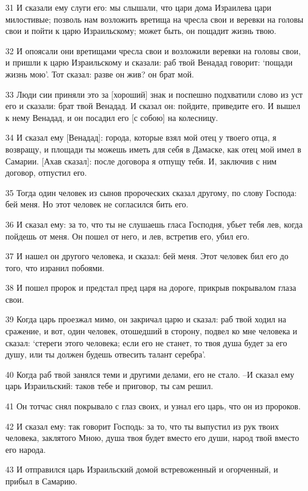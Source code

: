 \par 31 И сказали ему слуги его: мы слышали, что цари дома Израилева цари милостивые; позволь нам возложить вретища на чресла свои и веревки на головы свои и пойти к царю Израильскому; может быть, он пощадит жизнь твою.
\par 32 И опоясали они вретищами чресла свои и возложили веревки на головы свои, и пришли к царю Израильскому и сказали: раб твой Венадад говорит: `пощади жизнь мою'. Тот сказал: разве он жив? он брат мой.
\par 33 Люди сии приняли это за [хороший] знак и поспешно подхватили слово из уст его и сказали: брат твой Венадад. И сказал он: пойдите, приведите его. И вышел к нему Венадад, и он посадил его [с собою] на колесницу.
\par 34 И сказал ему [Венадад]: города, которые взял мой отец у твоего отца, я возвращу, и площади ты можешь иметь для себя в Дамаске, как отец мой имел в Самарии. [Ахав сказал]: после договора я отпущу тебя. И, заключив с ним договор, отпустил его.
\par 35 Тогда один человек из сынов пророческих сказал другому, по слову Господа: бей меня. Но этот человек не согласился бить его.
\par 36 И сказал ему: за то, что ты не слушаешь гласа Господня, убьет тебя лев, когда пойдешь от меня. Он пошел от него, и лев, встретив его, убил его.
\par 37 И нашел он другого человека, и сказал: бей меня. Этот человек бил его до того, что изранил побоями.
\par 38 И пошел пророк и предстал пред царя на дороге, прикрыв покрывалом глаза свои.
\par 39 Когда царь проезжал мимо, он закричал царю и сказал: раб твой ходил на сражение, и вот, один человек, отошедший в сторону, подвел ко мне человека и сказал: `стереги этого человека; если его не станет, то твоя душа будет за его душу, или ты должен будешь отвесить талант серебра'.
\par 40 Когда раб твой занялся теми и другими делами, его не стало. --И сказал ему царь Израильский: таков тебе и приговор, ты сам решил.
\par 41 Он тотчас снял покрывало с глаз своих, и узнал его царь, что он из пророков.
\par 42 И сказал ему: так говорит Господь: за то, что ты выпустил из рук твоих человека, заклятого Мною, душа твоя будет вместо его души, народ твой вместо его народа.
\par 43 И отправился царь Израильский домой встревоженный и огорченный, и прибыл в Самарию.

